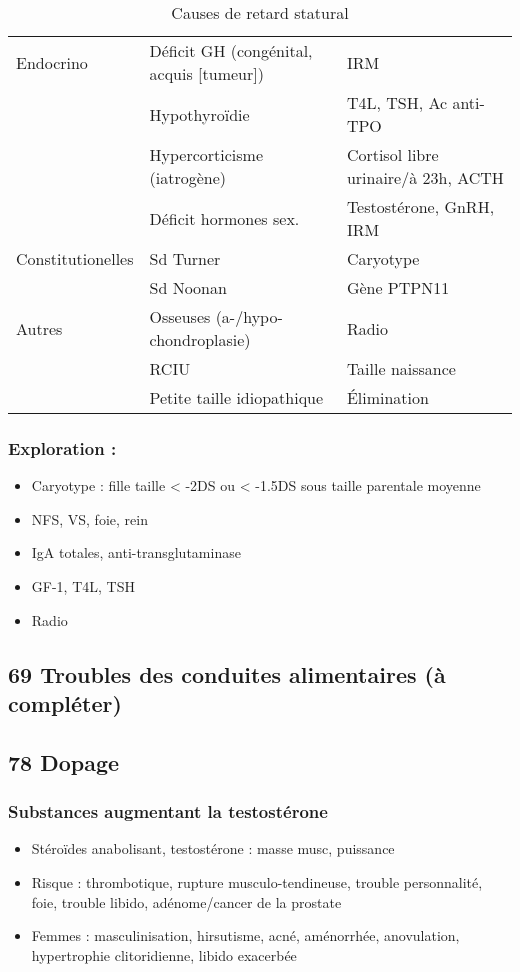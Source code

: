\documentclass[11pt]{article}
\begin{document}
\begin{table}[htbp]
\caption{\label{tab:org897368b}
Causes de retard statural}
\centering
\begin{tabular}{lll}
Endocrino & Déficit GH (congénital, acquis [tumeur]) & IRM\\
 & Hypothyroïdie & T4L, TSH, Ac anti-TPO\\
 & Hypercorticisme (iatrogène) & Cortisol libre urinaire/à 23h, ACTH\\
 & Déficit hormones sex. & Testostérone, GnRH, IRM\\
\hline
Constitutionelles & Sd Turner & Caryotype\\
 & Sd Noonan & Gène PTPN11\\
\hline
Autres & Osseuses (a-/hypo-chondroplasie) & Radio\\
 & RCIU & Taille naissance\\
 & Petite taille idiopathique & Élimination\\
\end{tabular}
\end{table}


\subsubsection{Exploration :}
\label{sec:orgf3d1440}
\begin{itemize}
\item Caryotype : fille taille < -2DS ou < -1.5DS sous taille parentale moyenne
\item NFS, VS, foie, rein
\item IgA totales, anti-transglutaminase
\item GF-1, T4L, TSH
\item Radio
\end{itemize}

\subsection{69 \textdagger{} Troubles des conduites alimentaires (à compléter)}
\label{sec:orgc8ce870}
\subsection{78 \textdagger{} Dopage}
\label{sec:orgea8c418}
\subsubsection{Substances augmentant la testostérone}
\label{sec:org2f4bfd4}
\begin{itemize}
\item Stéroïdes anabolisant, testostérone : \inc masse musc, puissance
\item Risque : thrombotique, rupture musculo-tendineuse, trouble personnalité, foie, trouble libido, adénome/cancer de la prostate
\item Femmes : masculinisation, hirsutisme, acné, aménorrhée, anovulation, hypertrophie clitoridienne, libido exacerbée
\end{itemize}
\end{document}
